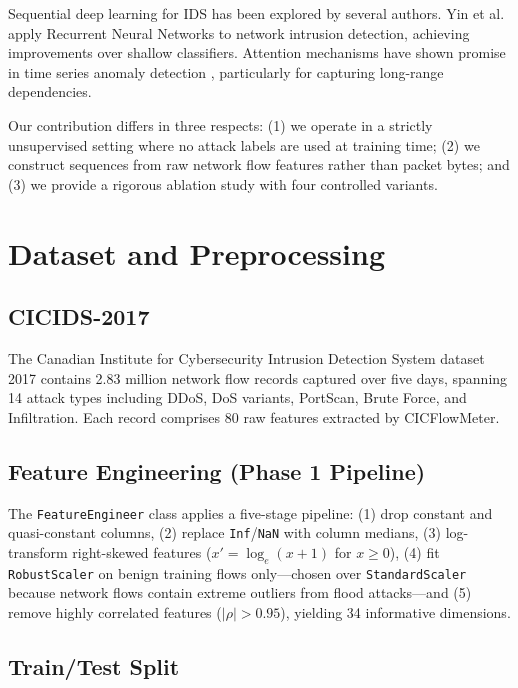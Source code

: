 \documentclass[conference]{IEEEtran}
\begin{document}
Sequential deep learning for IDS has been explored by several authors. Yin et al. apply
Recurrent Neural Networks to network intrusion detection, achieving improvements over
shallow classifiers. Attention mechanisms have shown promise in time series anomaly detection
\cite{vaswani2017attention}, particularly for capturing long-range dependencies.

Our contribution differs in three respects: (1) we operate in a strictly unsupervised setting
where no attack labels are used at training time; (2) we construct sequences from raw network
flow features rather than packet bytes; and (3) we provide a rigorous ablation study
with four controlled variants.

\section{Dataset and Preprocessing}

\subsection{CICIDS-2017}

The Canadian Institute for Cybersecurity Intrusion Detection System dataset 2017
\cite{sharafaldin2018} contains 2.83 million network flow records captured over five days,
spanning 14 attack types including DDoS, DoS variants, PortScan, Brute Force, and Infiltration.
Each record comprises 80 raw features extracted by CICFlowMeter.

\subsection{Feature Engineering (Phase 1 Pipeline)}

The \texttt{FeatureEngineer} class applies a five-stage pipeline:
(1) drop constant and quasi-constant columns, (2) replace \texttt{Inf}/\texttt{NaN} with
column medians, (3) log-transform right-skewed features
($x' = \log_e(x + 1)$ for $x \ge 0$), (4) fit \texttt{RobustScaler} on benign training
flows only—chosen over \texttt{StandardScaler} because network flows contain extreme outliers
from flood attacks—and (5) remove highly correlated features ($|\rho| > 0.95$), yielding 34
informative dimensions.

\subsection{Train/Test Split}
\end{document}
